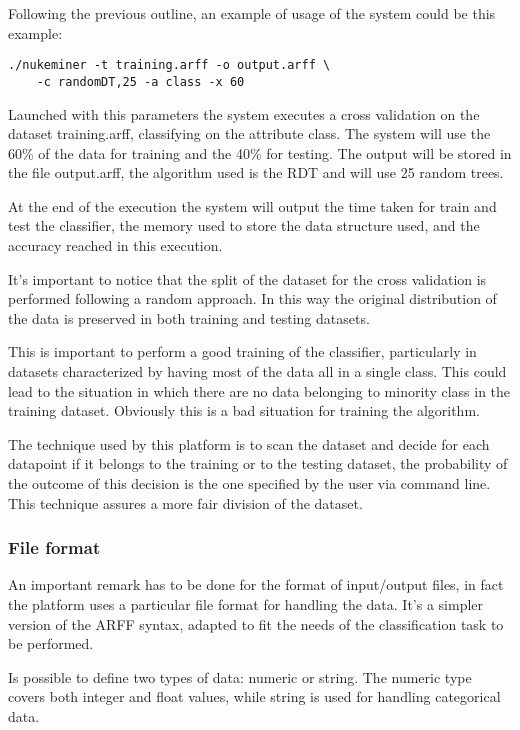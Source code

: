 \documentclass{acm_proc_article-sp-sigmod07}
\begin{document}
Following the previous outline, an example of usage of the system could be
this example:
\begin{verbatim}
./nukeminer -t training.arff -o output.arff \
    -c randomDT,25 -a class -x 60
\end{verbatim}

Launched with this parameters the system executes a cross validation on
the dataset training.arff, classifying on the attribute class. The system
will use the 60\% of the data for training and the 40\% for testing. The
output will be stored in the file output.arff, the algorithm used is the
RDT and will use 25 random trees.

At the end of the execution the system will output the time taken for
train and test the classifier, the memory used to store the data structure
used, and the accuracy reached in this execution.

It's important to notice that the split of the dataset for the cross
validation is performed following a random approach. In this way the
original distribution of the data is preserved in both training and
testing datasets.

This is important to perform a good training of the classifier,
particularly in datasets characterized by having most of the data all in a
single class. This could lead to the situation in which there are no data
belonging to minority class in the training dataset.
Obviously this is a bad situation for training the algorithm.

The technique used by this platform is to scan the dataset and decide for
each datapoint if it belongs to the training or to the testing dataset,
the probability of the outcome of this decision is the one specified by
the user via command line.
This technique assures a more fair division of the dataset.

\subsubsection{File format}
An important remark has to be done for the format of input/output files,
in fact the platform uses a particular file format for handling the data.
It's a simpler version of the ARFF syntax, adapted to fit the needs of the
classification task to be performed.

Is possible to define two types of data: numeric or string. The numeric
type covers both integer and float values, while string is used for
handling categorical data.
\end{document}
